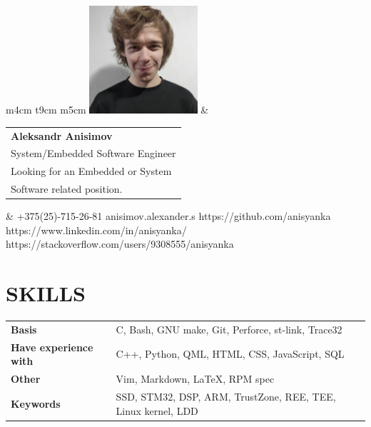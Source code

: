 \documentclass{anisyan-resume}
\begin{document}
	\begin{tabular}{ m{4cm} t{9cm} m{5cm} }
		\includegraphics[width=4cm, height=4cm]{avatar1.jpg}
		&
		\begin{tabular}{ m{9cm} }
			\textbf{\Huge Aleksandr Anisimov} \\
			\Large {System/Embedded Software Engineer} \\
			\vspace{1cm}
			\large{Looking for an Embedded or System} \\
			\large{Software related position.}	
		\end{tabular}
		&
		 					{+375(25)-715-26-81}
		 					{anisimov.alexander.s}
		 					{https://github.com/anisyanka}
		 					{https://www.linkedin.com/in/anisyanka/}
		 					{https://stackoverflow.com/users/9308555/anisyanka}
	\end{tabular}

	\vspace{5pt}
	\section{\textbf{SKILLS}}
	\vspace{5pt}
	\def\arraystretch{1.2}
	\begin{tabular}{ >{\quad}l p{12.5cm} }
		\normalsize\textbf{Basis} & \normalsize{C, Bash, GNU make, Git, Perforce, st-link, Trace32} \\
			\normalsize\textbf{Have experience with} & \normalsize{C++, Python, QML, HTML, CSS, JavaScript, SQL} \\
		\normalsize\textbf{Other} & \normalsize{Vim, Markdown, \LaTeX, RPM spec} \\
		\normalsize\textbf{Keywords} & \normalsize{SSD, STM32, DSP, ARM, TrustZone, REE, TEE, Linux kernel, LDD} \\
	\end{tabular}

	\vspace{5pt}
\end{document}
